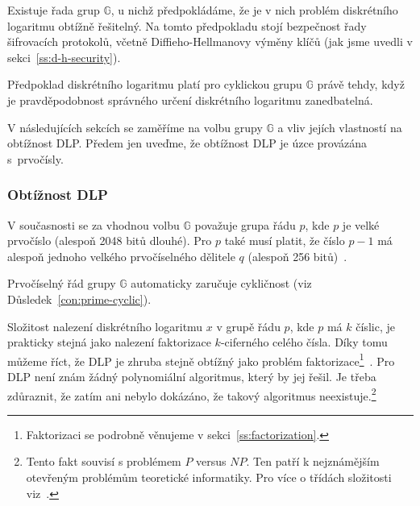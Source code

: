 \documentclass[
  program=infoi,
  biblatex=false,
  figures=true,
  glossaries,
  tables=false,
  sourcecodes=true,
  index
]{kidiplom}
\begin{document}
    Existuje řada grup $\mathbb{G}$, u nichž předpokládáme, že je v nich problém diskrétního logaritmu obtížně řešitelný.
    Na tomto předpokladu stojí bezpečnost řady šifrovacích protokolů, včetně Diffieho-Hellmanovy výměny klíčů
    (jak jsme uvedli v sekci~\ref{ss:d-h-security}).

    \begin{definition}\label{def:discrete-log-assumption}
                    
        Předpoklad diskrétního logaritmu platí pro cyklickou grupu $\mathbb{G}$ právě tehdy, když
        je pravděpodobnost správného určení diskrétního logaritmu zanedbatelná. 

    \end{definition}

    V následujících sekcích se zaměříme na volbu grupy $\mathbb{G}$ a vliv jejích
    vlastností na obtížnost DLP.
    Předem jen uveďme, že obtížnost DLP je úzce provázána s~prvočísly.


    \subsubsection{Obtížnost DLP}\label{ss:discrete-log-complexity}

        V současnosti se za vhodnou volbu $\mathbb{G}$ považuje grupa řádu $p$, kde
        $p$ je velké prvočíslo (alespoň 2048 bitů dlouhé). Pro $p$ také musí platit, že číslo $p-1$ má alespoň
        jednoho velkého prvočíselného dělitele $q$ (alespoň 256 bitů)~\cite{graduate-course}.

        \begin{remark}
            Prvočíselný řád grupy $\mathbb{G}$ automaticky zaručuje cykličnost (viz Důsledek~\ref{con:prime-cyclic}).
        \end{remark}

        Složitost nalezení diskrétního logaritmu $x$ v grupě řádu $p$, kde $p$ má $k$ číslic, je prakticky
        stejná jako nalezení faktorizace $k$-ciferného celého čísla.
        Díky tomu můžeme říct, že DLP je zhruba stejně obtížný jako problém faktorizace\footnote{Faktorizaci
        se podrobně věnujeme v sekci~\ref{ss:factorization}.}~\cite{comparison-dlp-factorization}.
        Pro DLP není znám žádný polynomiální algoritmus, který by jej řešil.
        Je třeba zdůraznit, že zatím ani nebylo dokázáno, že takový algoritmus neexistuje.\footnote{Tento fakt souvisí s problémem
        $P$ versus $NP$. Ten patří k nejznámějším otevřeným problémům teoretické informatiky.
        Pro více o třídách složitosti viz~\cite{complexity}.}
\end{document}
